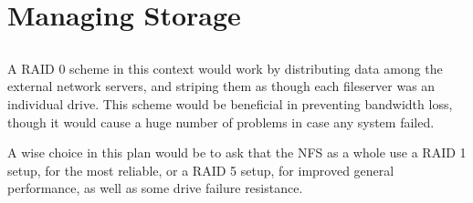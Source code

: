\documentclass{article}
\begin{document}
\subsection{}

\subsection{}

\setcounter{section}{5}
\setcounter{subsection}{0}
\section*{Managing Storage}
\subsection{}
A RAID 0 scheme in this context would work by distributing data among the external network servers, and striping them as though each fileserver was an individual drive. This scheme would be beneficial in preventing bandwidth loss, though it would cause a huge number of problems in case any system failed.

A wise choice in this plan would be to ask that the NFS as a whole use a RAID 1 setup, for the most reliable, or a RAID 5 setup, for improved general performance, as well as some drive failure resistance.

\subsection{}

\subsection{}

\subsection{}
\end{document}
